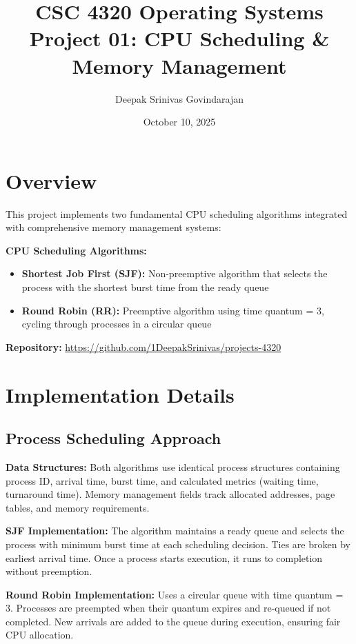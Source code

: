 \documentclass[12pt]{article}
\title{
    \textbf{CSC 4320 Operating Systems} \\
    \large Project 01: CPU Scheduling \& Memory Management
}
\author{Deepak Srinivas Govindarajan}
\date{October 10, 2025}
\begin{document}
\maketitle
\thispagestyle{empty}

\section{Overview}

This project implements two fundamental CPU scheduling algorithms integrated with comprehensive memory management systems:

\textbf{CPU Scheduling Algorithms:}
\begin{itemize}
    \item \textbf{Shortest Job First (SJF):} Non-preemptive algorithm that selects the process with the shortest burst time from the ready queue
    \item \textbf{Round Robin (RR):} Preemptive algorithm using time quantum = 3, cycling through processes in a circular queue
\end{itemize}

\textbf{Repository:} \url{https://github.com/1DeepakSrinivas/projects-4320}

\section{Implementation Details}

\subsection{Process Scheduling Approach}

\textbf{Data Structures:} Both algorithms use identical process structures containing process ID, arrival time, burst time, and calculated metrics (waiting time, turnaround time). Memory management fields track allocated addresses, page tables, and memory requirements.

\textbf{SJF Implementation:} The algorithm maintains a ready queue and selects the process with minimum burst time at each scheduling decision. Ties are broken by earliest arrival time. Once a process starts execution, it runs to completion without preemption.

\textbf{Round Robin Implementation:} Uses a circular queue with time quantum = 3. Processes are preempted when their quantum expires and re-queued if not completed. New arrivals are added to the queue during execution, ensuring fair CPU allocation.
\end{document}
